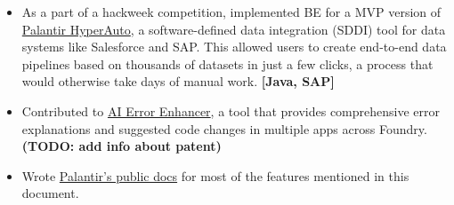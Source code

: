 \begin{itemize}
{        It replaced multiple pre-existing ad-hoc tools and allowed monitoring of entire data pipelines in a set-and-forget way.
    }
    \textbf{[Java]}
    \item {
        As a part of a hackweek competition, implemented BE for a MVP version of
        \href{https://www.palantir.com/docs/foundry/hyperauto/overview/}{Palantir HyperAuto},
        a software-defined data integration (SDDI) tool for data systems like Salesforce and SAP.
        This allowed users to create end-to-end data pipelines based on thousands of datasets
        in just a few clicks, a process that would otherwise take days of manual work.
    }
    \textbf{[Java, SAP]}
    \item {
        Contributed to
        \href{https://www.palantir.com/docs/foundry/code-repositories/aip-features/#ai-error-enhancer}{AI Error Enhancer},
        a tool that provides comprehensive error explanations and suggested code changes in multiple apps across Foundry.
    }
    \textbf{(TODO: add info about patent)}
    \item {
        Wrote
        \href{https://www.palantir.com/docs/foundry/}{Palantir's public docs}
        for most of the features mentioned in this document.
    }
\end{itemize}

